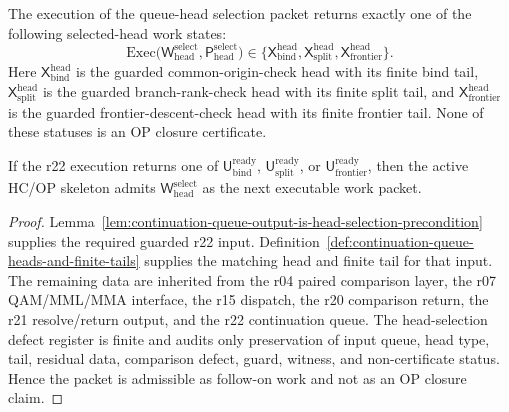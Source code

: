 \begin{definition}
\label{def:r23-queue-head-selection-output}
The execution of the queue-head selection packet returns exactly one of the following selected-head work states:
\[
\mathrm{Exec}\bigl(\mathsf W_{\mathrm{head}}^{\mathrm{select}},
                   \mathsf P_{\mathrm{head}}^{\mathrm{select}}\bigr)
\in
\{\mathsf X_{\mathrm{bind}}^{\mathrm{head}},
  \mathsf X_{\mathrm{split}}^{\mathrm{head}},
  \mathsf X_{\mathrm{frontier}}^{\mathrm{head}}\}.
\]
Here \(\mathsf X_{\mathrm{bind}}^{\mathrm{head}}\) is the guarded common-origin-check head with its finite bind tail, \(\mathsf X_{\mathrm{split}}^{\mathrm{head}}\) is the guarded branch-rank-check head with its finite split tail, and \(\mathsf X_{\mathrm{frontier}}^{\mathrm{head}}\) is the guarded frontier-descent-check head with its finite frontier tail.  None of these statuses is an OP closure certificate.
\end{definition}

\begin{proposition}
\label{prop:queue-head-selection-packet-admissible-after-r22-queue-return}
If the r22 execution returns one of \(\mathsf U_{\mathrm{bind}}^{\mathrm{ready}}\), \(\mathsf U_{\mathrm{split}}^{\mathrm{ready}}\), or \(\mathsf U_{\mathrm{frontier}}^{\mathrm{ready}}\), then the active HC/OP skeleton admits \(\mathsf W_{\mathrm{head}}^{\mathrm{select}}\) as the next executable work packet.
\end{proposition}

\begin{proof}
Lemma~\ref{lem:continuation-queue-output-is-head-selection-precondition} supplies the required guarded r22 input.  Definition~\ref{def:continuation-queue-heads-and-finite-tails} supplies the matching head and finite tail for that input.  The remaining data are inherited from the r04 paired comparison layer, the r07 QAM/MML/MMA interface, the r15 dispatch, the r20 comparison return, the r21 resolve/return output, and the r22 continuation queue.  The head-selection defect register is finite and audits only preservation of input queue, head type, tail, residual data, comparison defect, guard, witness, and non-certificate status.  Hence the packet is admissible as follow-on work and not as an OP closure claim.
\end{proof}

